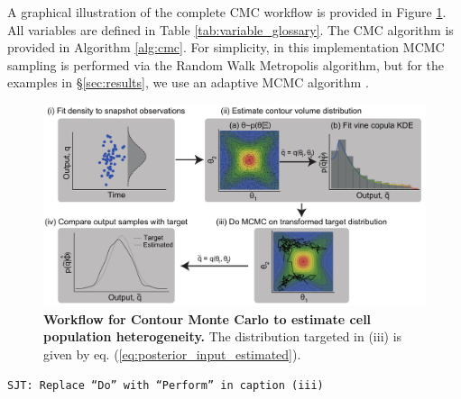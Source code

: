 A graphical illustration of the complete CMC workflow is provided in Figure \ref{fig:workflow}. All variables are defined in Table \ref{tab:variable_glossary}. The CMC algorithm is provided in Algorithm \ref{alg:cmc}. For simplicity, in this implementation MCMC sampling is performed via the Random Walk Metropolis algorithm, but for the examples in \S \ref{sec:results}, we use an adaptive MCMC algorithm \cite{johnstone2016uncertainty}.

\begin{figure}[H]
  \centerline{\includegraphics[width=1.5\textwidth]{../figures/workflow.pdf}}
  \caption{\textbf{Workflow for Contour Monte Carlo to estimate cell population heterogeneity.} The distribution targeted in (iii) is given by eq. (\ref{eq:posterior_input_estimated}).}
  \label{fig:workflow}
\end{figure}
{\tt SJT: Replace ``Do'' with ``Perform'' in caption (iii)}

